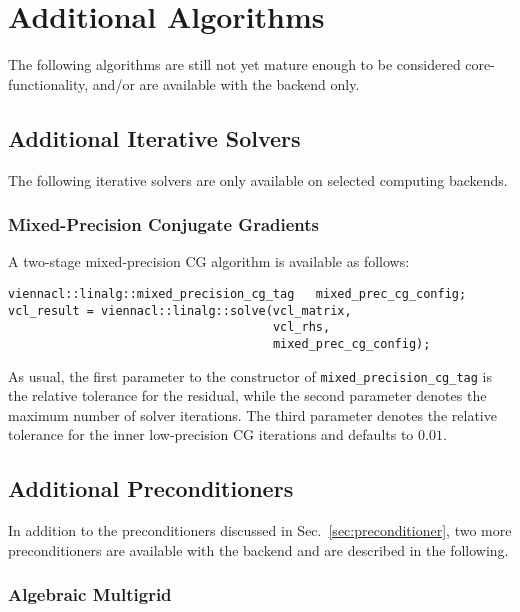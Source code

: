 \chapter{Additional Algorithms} \label{chap:additional-algorithms}
The following algorithms are still not yet mature enough to be considered core-functionality, and/or are available with the {\OpenCL} backend only.

\section{Additional Iterative Solvers}
The following iterative solvers are only available on selected computing backends.

\subsection{Mixed-Precision Conjugate Gradients}
A two-stage mixed-precision CG algorithm is available as follows:
\begin{lstlisting}
viennacl::linalg::mixed_precision_cg_tag   mixed_prec_cg_config;
vcl_result = viennacl::linalg::solve(vcl_matrix,
                                     vcl_rhs,
                                     mixed_prec_cg_config);
\end{lstlisting}
As usual, the first parameter to the constructor of \lstinline|mixed_precision_cg_tag| is the relative tolerance for the residual, while the second parameter denotes the maximum number of solver iterations.
The third parameter denotes the relative tolerance for the inner low-precision CG iterations and defaults to $0.01$.




\section{Additional Preconditioners}
In addition to the preconditioners discussed in Sec.~\ref{sec:preconditioner}, two more preconditioners are available with the {\OpenCL} backend and are described in the following.

\subsection{Algebraic Multigrid}

